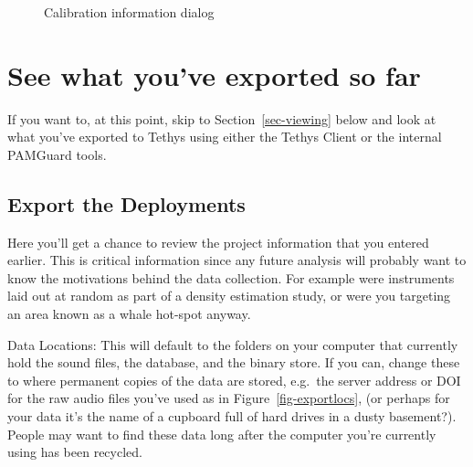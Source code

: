 \documentclass[
]{article}
\begin{document}
\begin{figure}
\begin{minipage}{0.50\linewidth}
{}


\end{minipage}%

\caption{\label{fig-cal}Calibration information dialog}

\end{figure}%

\section{See what you've exported so
far}\label{see-what-youve-exported-so-far}

If you want to, at this point, skip to Section~\ref{sec-viewing} below
and look at what you've exported to Tethys using either the Tethys
Client or the internal PAMGuard tools.

\subsection{Export the Deployments}\label{export-the-deployments}

Here you'll get a chance to review the project information that you
entered earlier. This is critical information since any future analysis
will probably want to know the motivations behind the data collection.
For example were instruments laid out at random as part of a density
estimation study, or were you targeting an area known as a whale
hot-spot anyway.

Data Locations: This will default to the folders on your computer that
currently hold the sound files, the database, and the binary store. If
you can, change these to where permanent copies of the data are stored,
e.g.~the server address or DOI for the raw audio files you've used as in
Figure~\ref{fig-exportlocs}, (or perhaps for your data it's the name of
a cupboard full of hard drives in a dusty basement?). People may want to
find these data long after the computer you're currently using has been
recycled.
\end{document}
